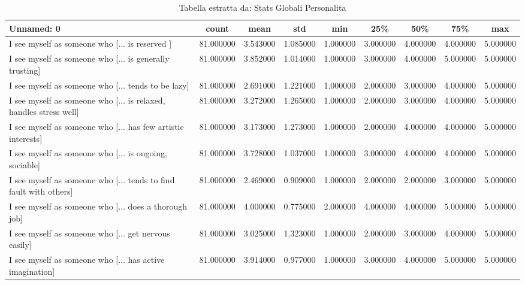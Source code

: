 \begin{table}[htbp]
\caption{Tabella estratta da: Stats Globali Personalita}
\label{tab:stats_globali_personalita}
\begin{tabular}{lcccccccc}
\toprule
Unnamed: 0 & count & mean & std & min & 25\% & 50\% & 75\% & max \\
\midrule
I see myself as someone who  [... is reserved ] & 81.000000 & 3.543000 & 1.085000 & 1.000000 & 3.000000 & 4.000000 & 4.000000 & 5.000000 \\
I see myself as someone who  [... is generally trusting] & 81.000000 & 3.852000 & 1.014000 & 1.000000 & 3.000000 & 4.000000 & 5.000000 & 5.000000 \\
I see myself as someone who  [... tends to be lazy] & 81.000000 & 2.691000 & 1.221000 & 1.000000 & 2.000000 & 3.000000 & 4.000000 & 5.000000 \\
I see myself as someone who  [... is relaxed, handles stress well] & 81.000000 & 3.272000 & 1.265000 & 1.000000 & 2.000000 & 3.000000 & 4.000000 & 5.000000 \\
I see myself as someone who  [... has few artistic interests] & 81.000000 & 3.173000 & 1.273000 & 1.000000 & 2.000000 & 4.000000 & 4.000000 & 5.000000 \\
I see myself as someone who  [... is ongoing, sociable] & 81.000000 & 3.728000 & 1.037000 & 1.000000 & 3.000000 & 4.000000 & 4.000000 & 5.000000 \\
I see myself as someone who  [... tends to find fault with others] & 81.000000 & 2.469000 & 0.909000 & 1.000000 & 2.000000 & 2.000000 & 3.000000 & 5.000000 \\
I see myself as someone who  [... does a thorough job] & 81.000000 & 4.000000 & 0.775000 & 2.000000 & 4.000000 & 4.000000 & 5.000000 & 5.000000 \\
I see myself as someone who  [... get nervous easily] & 81.000000 & 3.025000 & 1.323000 & 1.000000 & 2.000000 & 3.000000 & 4.000000 & 5.000000 \\
I see myself as someone who  [... has active imagination] & 81.000000 & 3.914000 & 0.977000 & 1.000000 & 3.000000 & 4.000000 & 5.000000 & 5.000000 \\
\bottomrule
\end{tabular}
\end{table}
